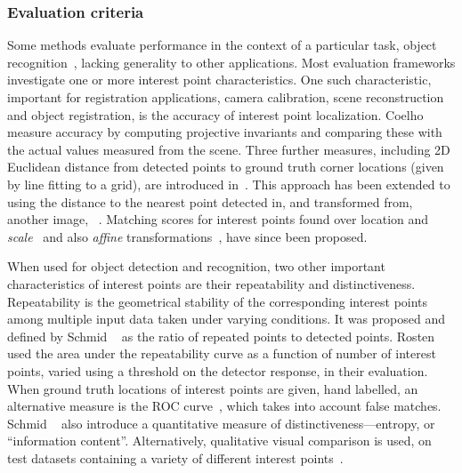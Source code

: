 \subsubsection{Evaluation criteria}
Some methods evaluate performance in the context of a particular task, \eg object recognition~\cite{Shin1999,Dutagaci2011}, 
lacking generality to other applications. Most evaluation frameworks investigate one or more interest point characteristics. 
One such characteristic, important for registration applications, \eg camera calibration, scene reconstruction and object registration, is the accuracy of interest point localization. 
Coelho \etal~\cite{Coelho1992} measure accuracy by computing projective invariants and comparing these with the actual values measured from the scene. Three further measures, including 2D Euclidean distance from detected points to ground truth corner locations (given by line fitting to a grid), are introduced in~\cite{Brand1994}. This approach has been extended to using the distance to the nearest point detected in, and transformed from, another image, \eg~\cite{Schmid2000}. Matching scores for interest points found over location and \emph{scale}~\cite{Laptev2003}
and also \emph{affine} transformations~\cite{Mikolajczyk2004}, have since been proposed.

When used for object detection and recognition, two other important characteristics of interest points are their repeatability and distinctiveness. 
Repeatability is the geometrical stability of the corresponding interest points among multiple input data taken under varying conditions. 
It was proposed and defined by Schmid \etal~\cite{Schmid2000} as the ratio of repeated points to detected points. 
Rosten \etal~\cite{Rosten2010} used the area under the repeatability curve as a function of number of interest points, varied using a threshold on the detector response, in their evaluation. 
When ground truth locations of interest points are given, \eg hand labelled, an alternative measure is the ROC curve~\cite{Bowyer1999}, which takes into account false matches.
Schmid \etal~\cite{Schmid2000} also introduce a quantitative measure of distinctiveness---entropy, or ``information content''.
Alternatively, qualitative visual comparison is used, on test datasets containing a variety of different interest points~\cite{Lindeberg1998,Laptev2005}.

